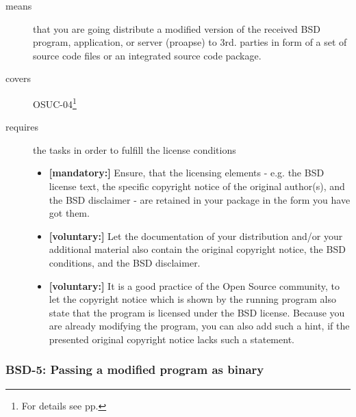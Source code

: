 \begin{description}
\item[means] that you are going distribute a modified version of the received
BSD program, application, or server (proapse) to 3rd. parties in form of a set
of source code files or an integrated source code package.
\item[covers] OSUC-04\footnote{For details see pp. \pageref{OSUC-04-DEF}}
\item[requires] the tasks in order to fulfill the license conditions
\begin{itemize}
  \item \textbf{[mandatory:]} Ensure, that the licensing elements - e.g.
  the BSD license text, the specific copyright notice of the original author(s),
  and the BSD disclaimer - are retained in your package in the form you have got
  them. 
  \item \textbf{[voluntary:]} Let the documentation of your distribution
  and/or your additional material also contain the original copyright notice, the
  BSD conditions, and the BSD disclaimer.
  
  \item \textbf{[voluntary:]} It is a good practice of the Open Source
  community, to let the copyright notice which is shown by the running program
  also state that the program is licensed under the BSD license. Because you are
  already modifying the program, you can also add such a hint, if the presented
  original copyright notice lacks such a statement.
\end{itemize}
\end{description}

\subsubsection{BSD-5: Passing a modified program as binary}

